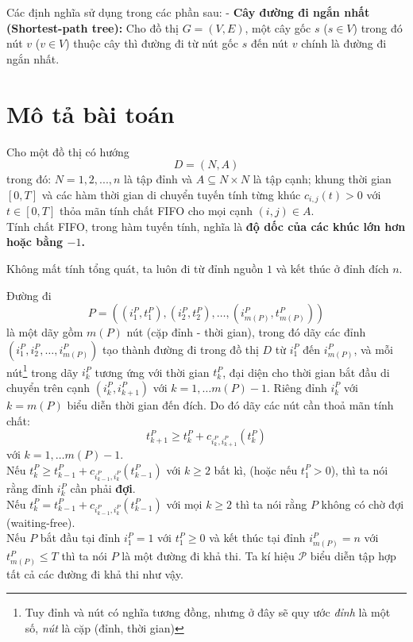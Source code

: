 \documentclass[../main.tex]{subfiles}
\begin{document}
Các định nghĩa sử dụng trong các phần sau: - \textbf{Cây đường đi ngắn
nhất (Shortest-path tree):} Cho đồ thị \(G=(V,E)\), một cây gốc \(s\)
(\(s\in V\)) trong đó nút \(v\) (\(v\in V\)) thuộc cây thì đường đi từ
nút gốc \(s\) đến nút \(v\) chính là đường đi ngắn nhất.

\section{Mô tả bài toán}\label{problem-description}

Cho một đồ thị có hướng 
\[
  D = (N, A)
\] 
trong đó: \(N = {1, 2, ..., n}\)
là tập đỉnh và \(A \subseteq N \times N\) là tập cạnh; khung thời gian
\([0, T]\) và các hàm thời gian di chuyển tuyến tính từng khúc
\(c_{i,j}(t) > 0\) với \(t \in [0, T]\) thỏa mãn tính chất FIFO cho mọi
cạnh \((i, j) \in A\).\\
Tính chất FIFO, trong hàm tuyến tính, nghĩa là
\textbf{độ dốc của các khúc lớn hơn hoặc bằng \(-1\).} 

Không mất tính tổng
quát, ta luôn đi từ đỉnh nguồn \(1\) và kết thúc ở đỉnh đích
\(n\).

Đường đi
\[
  P=((i_1^P, t_1^P), (i_2^P, t_2^P), \dots, (i_{m(P)}^P, t_{m(P)}^P))
\]
là một dãy gồm \(m(P)\) nút (cặp đỉnh - thời gian), trong đó dãy các đỉnh
\((i_1^P, i_2^P, \dots, i_{m(P)}^P)\) tạo thành đường đi trong đồ thị
\(D\) từ \(i_1^P\) đến \(i_{m(P)}^P\), và mỗi nút\footnote{Tuy đỉnh và nút có nghĩa tương đồng, nhưng ở đây sẽ quy ước \emph{đỉnh} là một số, \emph{nút} là cặp (đỉnh, thời gian)} trong dãy \(i_k^P\)
tương ứng với thời gian \(t_k^P\), đại diện cho thời gian bắt đầu di
chuyển trên cạnh \((i_k^P, i_{k+1}^P)\) với \(k=1, \dots m(P)-1\). Riêng
đỉnh \(i_k^P\) với \(k=m(P)\) biểu diễn thời gian đến đích. Do đó dãy
các nút cần thoả mãn tính chất:
\[t_{k+1}^P \ge t_k^P + c_{i_k^P, i_{k+1}^P}(t_k^P)\] với
\(k=1, \dots m(P)-1\). \\
Nếu
\(t_{k}^P \ge t_{k-1}^P + c_{i_{k-1}^P, i_{k}^P}(t_{k-1}^P)\) với \(k \ge 2\) bất kì, (hoặc nếu \(t_1^P > 0\)), thì ta nói rằng đỉnh \(i_k^P\)
cần phải \textbf{đợi}.\\ 
Nếu \(t_{k}^P = t_{k-1}^P + c_{i_{k-1}^P, i_{k}^P}(t_{k-1}^P)\) với mọi
\(k \ge 2\) thì ta nói rằng \(P\) không có chờ đợi (waiting-free). \\
Nếu \(P\) bắt đầu tại đỉnh \(i_1^P = 1\) với \(t_1^P\ge0\) và kết thúc tại
đỉnh \(i_{m(P)}^P=n\) với \(t_{m(P)}^P \le T\) thì ta nói \(P\) là một
đường đi khả thi. Ta kí hiệu \(\mathcal{P}\) biểu diễn tập hợp tất cả các
đường đi khả thi như vậy.
\end{document}
